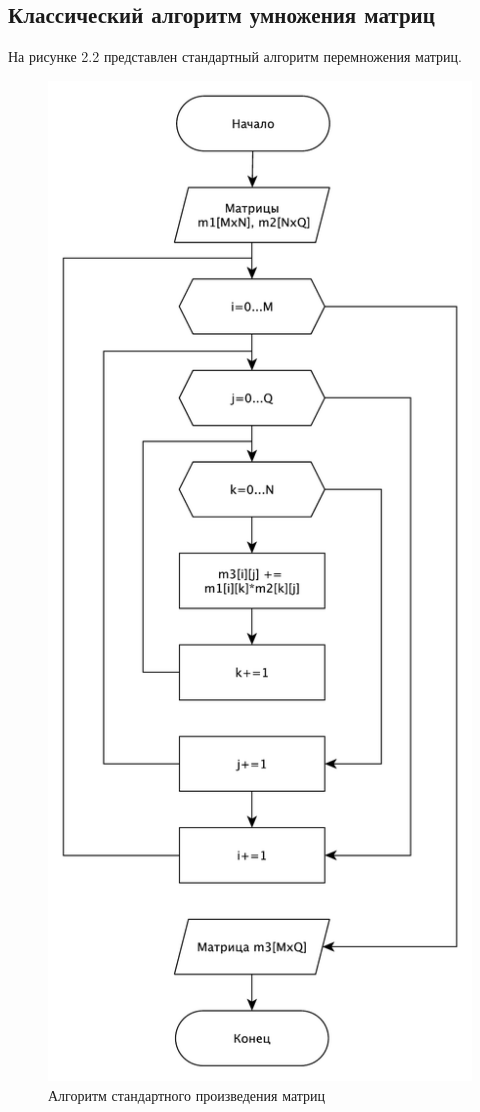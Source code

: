\subsection{Классический алгоритм умножения матриц}
На рисунке 2.2 представлен стандартный алгоритм перемножения матриц.
\begin{figure}
\centering
\includegraphics[scale=0.5]{shema1.pdf}
\caption{Алгоритм стандартного произведения матриц}
\end{figure}

